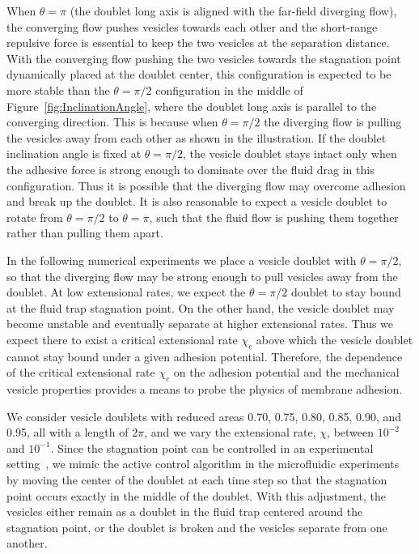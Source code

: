 \documentclass[prf,superscriptaddress,showpacs]{revtex4-1}
\begin{document}
When $\theta=\pi$ (the doublet long axis is aligned with the far-field diverging flow), the converging flow
pushes vesicles towards each other and the short-range repulsive force is essential to keep the two vesicles at the separation distance.
With the converging flow pushing the two vesicles towards the stagnation point dynamically placed at the doublet center, 
this configuration is expected to be more stable than the $\theta=\pi/2$ configuration in the middle of Figure~\ref{fig:InclinationAngle},  where  
the doublet long axis is parallel to the converging direction. This is because
when $\theta=\pi/2$ the diverging flow is pulling the vesicles away from each other as shown in the illustration. 
If the doublet inclination angle is fixed at $\theta=\pi/2$,
the vesicle doublet stays intact only when the adhesive force is strong enough to dominate over the fluid drag in this configuration.
Thus it is possible that the diverging flow may overcome adhesion and
break up the doublet. It is also reasonable to expect a vesicle doublet to rotate from $\theta=\pi/2$ to $\theta=\pi$,
such that the fluid flow is pushing them together rather than pulling them apart.

In the following numerical experiments we place a vesicle doublet with $\theta=\pi/2$, so that
the diverging flow may be strong enough to pull vesicles away from the doublet.
%
At low extensional
rates, we expect the $\theta=\pi/2$ doublet to stay bound at the fluid
trap stagnation point.  On the other hand, the vesicle doublet may
become unstable and eventually separate at higher extensional rates.
Thus we expect there to exist a critical extensional rate $\chi_c$ above which
the vesicle doublet cannot stay bound under a given adhesion potential.
Therefore, the dependence of the critical extensional rate $\chi_c$ on the
adhesion potential and the mechanical vesicle properties provides a
means to probe the physics of membrane adhesion.

We consider vesicle doublets with reduced areas 0.70, 0.75, 0.80, 0.85,
0.90, and 0.95, all with a length of $2\pi$, and we vary the extensional
rate, $\chi$, between $10^{-2}$ and $10^{-1}$.  Since the stagnation
point can be controlled in an experimental
setting~\cite{Johnson-Chavarria2011_EMJ}, we mimic the active control
algorithm in the microfluidic experiments by moving the center of the
doublet at each time step so that the stagnation point occurs exactly in
the middle of the doublet.  
With this adjustment, the vesicles either
remain as a doublet in the fluid trap centered around the stagnation
point, or the doublet is broken and the vesicles separate from one
another.  
\end{document}
